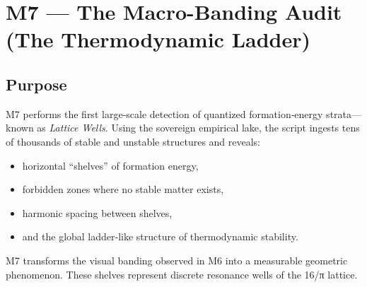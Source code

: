 \documentclass[11pt, letterpaper, openany]{book}
\begin{document}
\section{M7 — The Macro-Banding Audit (The Thermodynamic Ladder)}

\subsection*{Purpose}
M7 performs the first large‑scale detection of quantized formation‑energy
strata—known as \emph{Lattice Wells}. Using the sovereign empirical lake, the
script ingests tens of thousands of stable and unstable structures and reveals:

\begin{itemize}
    \item horizontal ``shelves'' of formation energy,
    \item forbidden zones where no stable matter exists,
    \item harmonic spacing between shelves,
    \item and the global ladder‑like structure of thermodynamic stability.
\end{itemize}

M7 transforms the visual banding observed in M6 into a measurable geometric
phenomenon. These shelves represent discrete resonance wells of the 16/π lattice.
\end{document}
